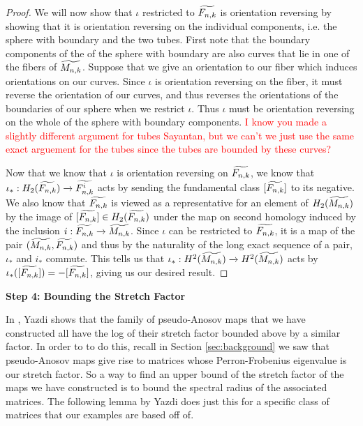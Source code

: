 \begin{proof}
We will now show that $\iota$ restricted to $\widetilde{F_{n,k}}$ is orientation reversing by showing that it is orientation reversing on the individual components, i.e. the sphere with boundary and the two tubes. First note that the boundary components of the of the sphere with boundary are also curves that lie in one of the fibers of $\widetilde{M_{n,k}}$. Suppose that we give an orientation to our fiber which induces orientations on our curves. Since $\iota$ is orientation reversing on the fiber, it must reverse the orientation of our curves, and thus reverses the orientations of the boundaries of our sphere when we restrict $\iota$. Thus $\iota$ must be orientation reversing on the whole of the sphere with boundary components. \textcolor{red}{I know you made a slightly different argument for tubes Sayantan, but we can't we just use the same exact arguement for the tubes since the tubes are bounded by these curves?}

Now that we know that $\iota$ is orientation reversing on $\widetilde{F_{n,k}}$, we know that $\iota_*: H_2(\widetilde{F_{n,k}}) \xrightarrow{} \widetilde{F^i_{n,k}}$ acts by sending the fundamental class $[\widetilde{F_{n,k}}]$ to its negative. We also know that $\widetilde{F_{n,k}}$ is viewed as a representative for an element of $H_2(\widetilde{M_{n,k}})$ by the image of $[\widetilde{F_{n,k}}] \in H_2(\widetilde{F_{n,k}})$ under the map on second homology induced by the inclusion $i: \widetilde{F_{n,k}} \xrightarrow[]{} \widetilde{M_{n,k}}$. Since $\iota$ can be restricted to $\widetilde{F_{n,k}}$, it is a map of the pair $(\widetilde{M_{n,k}},\widetilde{F_{n,k}})$ and thus by the naturality of the long exact sequence of a pair, $\iota_*$ and $i_*$ commute. This tells us that $\iota_*: H^2(\widetilde{M_{n,k}}) \xrightarrow[]{} H^2(\widetilde{M_{n,k}})$ acts by $\iota_*([\widetilde{F_{n,k}}]) = -[\widetilde{F_{n,k}}]$, giving us our desired result.
\end{proof}

\begin{center}
\textbf{Step 4: Bounding the Stretch Factor}
\end{center}


In \cite{yazdi2018pseudo}, Yazdi shows that the family of pseudo-Anosov maps that we have constructed all have the log of their stretch factor bounded above by a similar factor. In order to to do this, recall in Section \ref{sec:background} we saw that pseudo-Anosov maps give rise to matrices whose Perron-Frobenius eigenvalue is our stretch factor. So a way to find an upper bound of the stretch factor of the maps we have constructed is to bound the spectral radius of the associated matrices. The following lemma by Yazdi does just this for a specific class of matrices that our examples are based off of.

